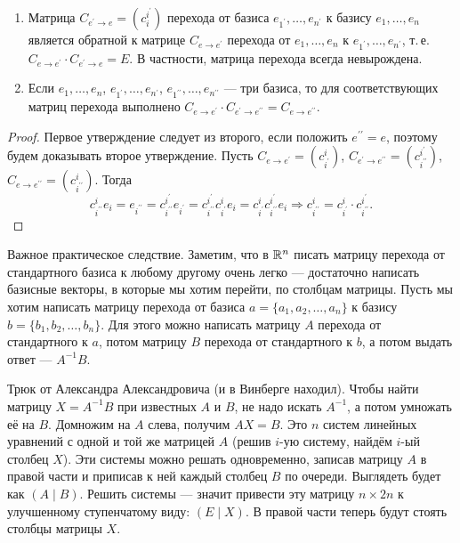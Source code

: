 \begin{proposal}
    \begin{enumerate}[nolistsep]
        \item Матрица $C_{e^\prime \to e} = (c^{i^\prime}_i)$ перехода от базиса $e_{1^\prime}, \ldots, e_{n^\prime}$ к базису $e_1, \ldots, e_n$ является обратной к матрице $C_{e \to e^\prime}$ перехода от $e_1, \ldots, e_n$ к $e_{1^\prime}, \ldots, e_{n^\prime}$, т.\,е. $C_{e \to e^\prime} \cdot C_{e^\prime \to e} = E$. В частности, матрица перехода всегда невырождена.
        \item Если $e_1, \ldots, e_n$, $e_{1^\prime}, \ldots, e_{n^\prime}$, $e_{1^{\prime\prime}}, \ldots, e_{n^{\prime\prime}}$ --- три базиса, то для соответствующих матриц перехода выполнено $C_{e \to e^\prime}\cdot C_{e^\prime \to e^{\prime\prime}} = C_{e \to e^{\prime\prime}}$.
    \end{enumerate}
\end{proposal}

\begin{proof}
    Первое утверждение следует из второго, если положить $e^{\prime\prime} = e$, поэтому будем доказывать второе утверждение. Пусть $C_{e \to e^\prime} = (c^i_{i^\prime})$, $C_{e^\prime \to e^{\prime\prime}} = (c^{i^\prime}_{i^{\prime\prime}})$, $C_{e \to e^{\prime\prime}} = (c^i_{i^{\prime\prime}})$. Тогда
    \[
        c^i_{i^{\prime\prime}}e_i = e_{i^{\prime\prime}} = c^{i^\prime}_{i^{\prime\prime}}e_{i^\prime} = c^{i^\prime}_{i^{\prime\prime}}c^i_{i^\prime}e_i = c^i_{i^\prime}c^{i^\prime}_{i^{\prime\prime}}e_i \Rightarrow c^i_{i^{\prime\prime}} = c^i_{i^\prime} \cdot c^{i^\prime}_{i^{\prime\prime}}.
    \]
\end{proof}

\begin{remark}
    Важное практическое следствие. Заметим, что в $\mathbb{R}^n$ писать матрицу перехода от стандартного базиса к любому другому очень легко --- достаточно написать базисные векторы, в которые мы хотим перейти, по столбцам матрицы. Пусть мы хотим написать матрицу перехода от базиса $a = \{a_1, a_2, \ldots, a_n\}$ к базису $b = \{b_1, b_2, \ldots, b_n\}$. Для этого можно написать матрицу $A$ перехода от стандартного к $a$, потом матрицу $B$ перехода от стандартного к $b$, а потом выдать ответ --- $A^{-1}B$.
\end{remark}

\begin{remark}
    Трюк от Александра Александровича (и в Винберге находил). Чтобы найти матрицу $X = A^{-1}B$ при известных $A$ и $B$, не надо искать $A^{-1}$, а потом умножать её на $B$. Домножим на $A$ слева, получим $AX = B$. Это $n$ систем линейных уравнений с одной и той же матрицей $A$ (решив $i$-ую систему, найдём $i$-ый столбец $X$). Эти системы можно решать одновременно, записав матрицу $A$ в правой части и приписав к ней каждый столбец $B$ по очереди. Выглядеть будет как $(A \mid B)$. Решить системы --- значит привести эту матрицу $n \times 2n$ к улучшенному ступенчатому виду: $(E \mid X)$. В правой части теперь будут стоять столбцы матрицы $X$.
\end{remark}

